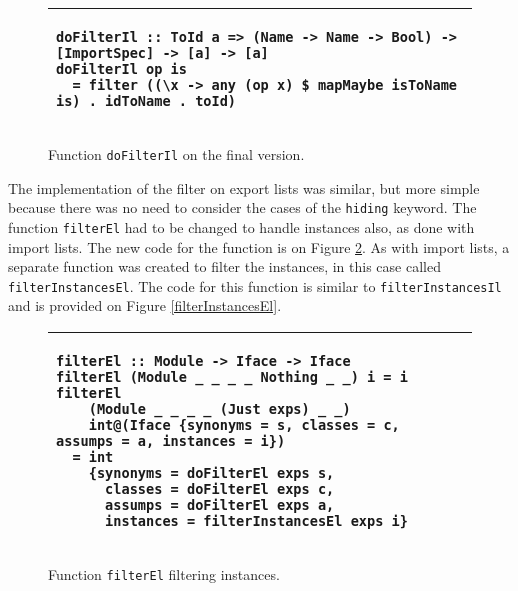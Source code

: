 \documentclass[msc]{ppgccufmg}
\begin{document}
\begin{figure}
\caption{Function \texttt{doFilterIl} on the final version.\label{doFilterIl-Final}}
\begin{tabular}{|p{\textwidth}|}
\hline
\begin{verbatim}
doFilterIl :: ToId a => (Name -> Name -> Bool) -> [ImportSpec] -> [a] -> [a]
doFilterIl op is
  = filter ((\x -> any (op x) $ mapMaybe isToName is) . idToName . toId)
\end{verbatim}
\\
\hline
\end{tabular}
\end{figure}

\begin{figure}
\caption{Function \texttt{filterInstancesIl} on the final version.\label{filterInstancesIl-Final}}
\begin{tabular}{|p{\textwidth}|}
\hline
\begin{verbatim}
filterInstancesIl
  :: ((Id, Id) -> (Id, Id) -> Bool) -> [ImportSpec] -> [Inst] -> [Inst]
filterInstancesIl op is
  = filter
    ((\x -> any (op x) $ mapMaybe importSpecToInstanceSpec is)
      . instToInstanceSpec)
\end{verbatim}
\\
\hline
\end{tabular}
\end{figure}

The implementation of the filter on export lists was similar, but more simple because there was no need to consider the cases of the \texttt{hiding} keyword.
The function \texttt{filterEl} had to be changed to handle instances also, as done with import lists.
The new code for the function is on Figure \ref{filterEl-new}.
As with import lists, a separate function was created to filter the instances, in this case called \texttt{filterInstancesEl}.
The code for this function is similar to \texttt{filterInstancesIl} and is provided on Figure \ref{filterInstancesEl}.

\begin{figure}
\caption{Function \texttt{filterEl} filtering instances.\label{filterEl-new}}
\begin{tabular}{|p{\textwidth}|}
\hline
\begin{verbatim}
filterEl :: Module -> Iface -> Iface
filterEl (Module _ _ _ _ Nothing _ _) i = i
filterEl
    (Module _ _ _ _ (Just exps) _ _)
    int@(Iface {synonyms = s, classes = c, assumps = a, instances = i})
  = int
    {synonyms = doFilterEl exps s,
      classes = doFilterEl exps c,
      assumps = doFilterEl exps a,
      instances = filterInstancesEl exps i}
\end{verbatim}
\\
\hline
\end{tabular}
\end{figure}
\end{document}
